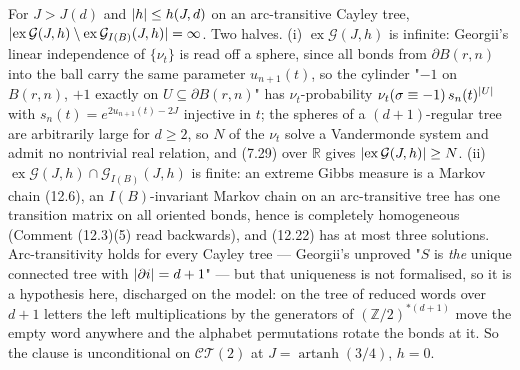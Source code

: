 \begin{theorem}
    For $J > J(d)$ and $\lvert h\rvert \leq h(J,d)$ on an arc-transitive Cayley tree,
    $\lvert \operatorname{ex}\mathcal G(J,h) \setminus \operatorname{ex}\mathcal G_{I(B)}(J,h)\rvert
    = \infty$. Two halves. (i) $\operatorname{ex}\mathcal G(J,h)$ is infinite: Georgii's linear
    independence of $\{\nu_t\}$ is read off a sphere, since all bonds from $\partial B(r,n)$ into
    the ball carry the same parameter $u_{n+1}(t)$, so the cylinder "$-1$ on $B(r,n)$, $+1$ exactly
    on $U \subseteq \partial B(r,n)$" has $\nu_t$-probability
    $\nu_t(\sigma \equiv -1) \, s_n(t)^{\lvert U\rvert}$ with $s_n(t) = e^{2u_{n+1}(t) - 2J}$ injective in
    $t$; the spheres of a $(d+1)$-regular tree are arbitrarily large for $d \geq 2$, so $N$ of the
    $\nu_t$ solve a Vandermonde system and admit no nontrivial real relation, and (7.29) over
    $\mathbb R$ gives $\lvert \operatorname{ex}\mathcal G(J,h)\rvert \geq N$. (ii)
    $\operatorname{ex}\mathcal G(J,h) \cap \mathcal G_{I(B)}(J,h)$ is finite: an extreme Gibbs
    measure is a Markov chain (12.6), an $I(B)$-invariant Markov chain on an arc-transitive tree
    has one transition matrix on all oriented bonds, hence is completely homogeneous (Comment
    (12.3)(5) read backwards), and (12.22) has at most three solutions. Arc-transitivity
    holds for every Cayley tree --- Georgii's unproved "$S$ is \emph{the} unique connected tree
    with $\lvert \partial i\rvert = d+1$" --- but that uniqueness is not formalised, so it is a hypothesis
    here, discharged on the model: on the tree of reduced words over $d+1$ letters the left
    multiplications by the generators of $(\mathbb Z/2)^{*(d+1)}$ move the empty word anywhere and
    the alphabet permutations rotate the bonds at it. So the clause is unconditional on
    $\mathcal{CT}(2)$ at $J = \operatorname{artanh}(3/4)$, $h = 0$.
\end{theorem}

